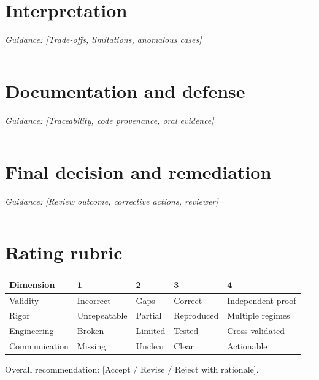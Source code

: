 \documentclass[11pt]{article}
\begin{document}
\section{Interpretation}
\noindent\textit{Guidance: [Trade-offs, limitations, anomalous cases]}\par\vspace{0.9cm}\hrule\vspace{0.25cm}
\section{Documentation and defense}
\noindent\textit{Guidance: [Traceability, code provenance, oral evidence]}\par\vspace{0.9cm}\hrule\vspace{0.25cm}
\section{Final decision and remediation}
\noindent\textit{Guidance: [Review outcome, corrective actions, reviewer]}\par\vspace{0.9cm}\hrule\vspace{0.25cm}
\section{Rating rubric}\begin{tabularx}{\linewidth}{lXXXX}\toprule Dimension & 1 & 2 & 3 & 4 \\ \midrule
Validity & Incorrect & Gaps & Correct & Independent proof \\
Rigor & Unrepeatable & Partial & Reproduced & Multiple regimes \\
Engineering & Broken & Limited & Tested & Cross-validated \\
Communication & Missing & Unclear & Clear & Actionable \\ \bottomrule\end{tabularx}
Overall recommendation: [Accept / Revise / Reject with rationale].
\end{document}
